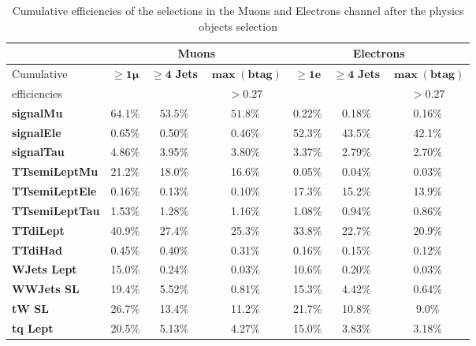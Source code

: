 \begin{table}[H]
    \centering
    \fontsize{11.5pt}{11.5pt}\selectfont
    \begin{tabular}{l|ccc||ccc}
        \toprule
         &  \multicolumn{3}{c||}{\textbf{Muons}} &\multicolumn{3}{c}{\textbf{Electrons}} \\
         \midrule
         \midrule
         Cumulative& \multirow{2}{*}{$\bm{\geq1 \mu}$} & \multirow{2}{*}{$\bm{\geq4}$ \textbf{Jets}} & $\bm{\max({\textbf{btag}})}$& \multirow{2}{*}{$\bm{\geq1e}$} & \multirow{2}{*}{$\bm{\geq4}$ \textbf{Jets}} & $\bm{\max({\textbf{btag}})}$\\
         efficiencies&&&$\bm{>0.27}$&&&$\bm{>0.27}$\\
         \midrule
         \textbf{signalMu}& $64.1\%$ & $53.5\%$ & $51.8\%$ &0.22\% & 0.18\% & 0.16\%\\
         \midrule
         \textbf{signalEle}& 0.65\% & 0.50\% & 0.46\% & 52.3\% & 43.5\% & 42.1\% \\
         \midrule
         \textbf{signalTau}& 4.86\% & 3.95\% & 3.80\% & 3.37\% & 2.79\% & 2.70\%\\
         \midrule
         \textbf{TTsemiLeptMu}& 21.2\% & 18.0\% & 16.6\% & 0.05\% & 0.04\% & 0.03\% \\
         \midrule
         \textbf{TTsemiLeptEle}& 0.16\% & 0.13\% & 0.10\% & 17.3\% & 15.2\% & 13.9\% \\
         \midrule
         \textbf{TTsemiLeptTau}& 1.53\%  & 1.28\% & 1.16\% &1.08\% &0.94\% &0.86\%\\
         \midrule
         \textbf{TTdiLept}& 40.9\% & 27.4\% & 25.3\% & 33.8\% &22.7\% &20.9\% \\
         \midrule
         \textbf{TTdiHad}& 0.45\%  & 0.40\% & 0.31\% & 0.16\% &0.15\% &0.12\% \\
         \midrule
         \textbf{WJets Lept}& 15.0\% & 0.24\% & 0.03\% & 10.6\% & 0.20\% &0.03\%\\
         \midrule
         \textbf{WWJets SL}& 19.4\% & 5.52\% & 0.81\% & 15.3\% & 4.42\% & 0.64\% \\
         \midrule
         \textbf{tW SL}& 26.7\% & 13.4\%  & 11.2\% & 21.7\% &10.8\% &9.0\%  \\
         \midrule
         \textbf{tq Lept}& 20.5\%  & 5.13\% & 4.27\% & 15.0\% & 3.83\% &3.18\% \\
         \bottomrule
    \end{tabular}
    \caption{Cumulative efficiencies of the selections in the Muons and Electrons channel after the physics objects selection}
    \label{tab:event_selection}
\end{table}

